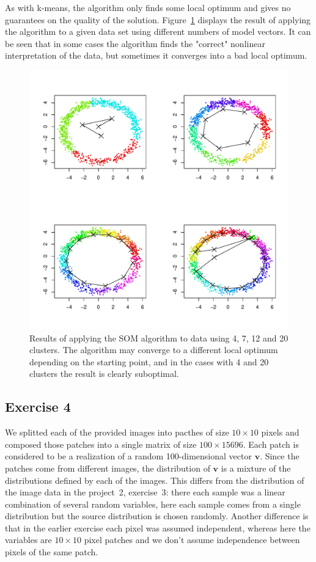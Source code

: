 \documentclass{article}
\renewcommand\vec[1]{\ensuremath{\mathbf{#1}}}
\begin{document}
As with k-means, the algorithm only finds some local optimum and gives no guarantees on the quality of the solution.
Figure~\ref{fig:som} displays the result of applying the algorithm to a given data set using different numbers of model vectors.
It can be seen that in some cases the algorithm finds the "correct" nonlinear interpretation of the data, but sometimes it converges into a bad local optimum.

\begin{figure}\centering
	\includegraphics[width=\columnwidth]{som}
	\caption{Results of applying the SOM algorithm to data using 4, 7, 12 and 20 clusters. The algorithm may converge to a different local optimum depending on the starting point, and in the cases with 4 and 20 clusters the result is clearly suboptimal.}\label{fig:som}
\end{figure}

\subsection{Exercise 4}
We splitted each of the provided images into pacthes of size $10\times10$ pixels and composed those patches into a single matrix of size $100\times 15696$.
Each patch is considered to be a realization of a random 100-dimensional vector \vec v.
Since the patches come from different images, the distribution of \vec v is a mixture of the distributions defined by each of the images.
This differs from the distribution of the image data in the project~2, exercise~3: there each sample was a linear combination of several random variables, here each sample comes from a single distribution but the source distribution is chosen randomly.
Another difference is that in the earlier exercise each pixel was assumed independent, whereas here the variables are $10\times 10$ pixel patches and we don't assume independence between pixels of the same patch.
\end{document}
